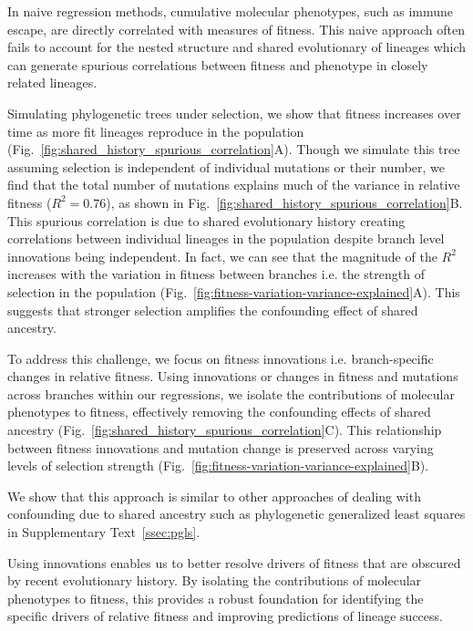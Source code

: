 In naive regression methods, cumulative molecular phenotypes, such as immune escape, are directly correlated with measures of fitness.
This naive approach often fails to account for the nested structure and shared evolutionary of lineages which can generate spurious correlations between fitness and phenotype in closely related lineages.

Simulating phylogenetic trees under selection, we show that fitness increases over time as more fit lineages reproduce in the population (Fig.~\ref{fig:shared_history_spurious_correlation}A).
Though we simulate this tree assuming selection is independent of individual mutations or their number, we find that the total number of mutations explains much of the variance in relative fitness ($R^2=0.76$), as shown in Fig.~\ref{fig:shared_history_spurious_correlation}B.
This spurious correlation is due to shared evolutionary history creating correlations between individual lineages in the population despite branch level innovations being independent.
In fact, we can see that the magnitude of the $R^2$ increases with the variation in fitness between branches i.e. the strength of selection in the population (Fig.~\ref{fig:fitness-variation-variance-explained}A).
This suggests that stronger selection amplifies the confounding effect of shared ancestry.

To address this challenge, we focus on fitness innovations i.e. branch-specific changes in relative fitness. 
Using innovations or changes in fitness and mutations across branches within our regressions, we isolate the contributions of molecular phenotypes to fitness, effectively removing the confounding effects of shared ancestry (Fig.~\ref{fig:shared_history_spurious_correlation}C).
This relationship between fitness innovations and mutation change is preserved across varying levels of selection strength (Fig.~\ref{fig:fitness-variation-variance-explained}B).

We show that this approach is similar to other approaches of dealing with confounding due to shared ancestry such as phylogenetic generalized least squares in Supplementary Text~\ref{ssec:pgls}.

Using innovations enables us to better resolve drivers of fitness that are obscured by recent evolutionary history.
By isolating the contributions of molecular phenotypes to fitness, this provides a robust foundation for identifying the specific drivers of relative fitness and improving predictions of lineage success.

